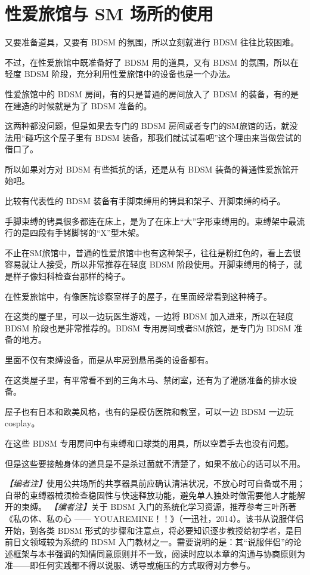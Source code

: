 \documentclass[12pt,UTF8]{ctexbook}
\begin{document}
\section{性爱旅馆与 SM 场所的使用}

又要准备道具，又要有 BDSM 的氛围，所以立刻就进行 BDSM 往往比较困难。

不过，在性爱旅馆中既准备好了 BDSM 用的道具，又有 BDSM 的氛围，所以在轻度 BDSM 阶段，充分利用性爱旅馆中的设备也是一个办法。

性爱旅馆中的 BDSM 房间，有的只是普通的房间放入了 BDSM 的装备，有的是在建造的时候就是为了 BDSM 准备的。

这两种都没问题，但是如果去专门的 BDSM 房间或者专门的SM旅馆的话，就没法用“碰巧这个屋子里有 BDSM 装备，那我们就试试看吧”这个理由来当做尝试的借口了。

所以如果对方对 BDSM 有些抵抗的话，还是从有 BDSM 装备的普通性爱旅馆开始吧。

比较有代表性的 BDSM 装备有手脚束缚用的铐具和架子、开脚束缚的椅子。

手脚束缚的铐具很多都连在床上，是为了在床上“大”字形束缚用的。束缚架中最流行的是四段有手铐脚铐的“X”型木架。

不止在SM旅馆中，普通的性爱旅馆中也有这种架子，往往是粉红色的，看上去很容易就让人接受，所以非常推荐在轻度 BDSM 阶段使用。开脚束缚用的椅子，就是样子像妇科检查台那样的椅子。

在性爱旅馆中，有像医院诊察室样子的屋子，在里面经常看到这种椅子。

在这类的屋子里，可以一边玩医生游戏，一边将 BDSM 加入进来，所以在轻度 BDSM 阶段也是非常推荐的。BDSM 专用房间或者SM旅馆，是专门为 BDSM 准备的地方。

里面不仅有束缚设备，而是从牢房到悬吊类的设备都有。

在这类屋子里，有平常看不到的三角木马、禁闭室，还有为了灌肠准备的排水设备。

屋子也有日本和欧美风格，也有的是模仿医院和教室，可以一边 BDSM 一边玩cosplay。

在这些 BDSM 专用房间中有束缚和口球类的用具，所以空着手去也没有问题。

但是这些要接触身体的道具是不是杀过菌就不清楚了，如果不放心的话可以不用。

\noindent\textit{【编者注】}使用公共场所的共享器具前应确认清洁状况，不放心时可自备或不用；自带的束缚器械须检查稳固性与快速释放功能，避免单人独处时做需要他人才能解开的束缚。
\textit{【编者注】}关于 BDSM 入门的系统化学习资源，推荐参考三叶所著《私の体、私の心 —— YOUAREMINE！！》（一迅社，2014）。该书从说服伴侣开始，到各类 BDSM 形式的步骤和注意点，将必要知识逐步教授给初学者，是目前日文领域较为系统的 BDSM 入门教材之一。需要说明的是：其“说服伴侣”的论述框架与本书强调的知情同意原则并不一致，阅读时应以本章的沟通与协商原则为准——即任何实践都不得以说服、诱导或施压的方式取得对方参与。
\end{document}
